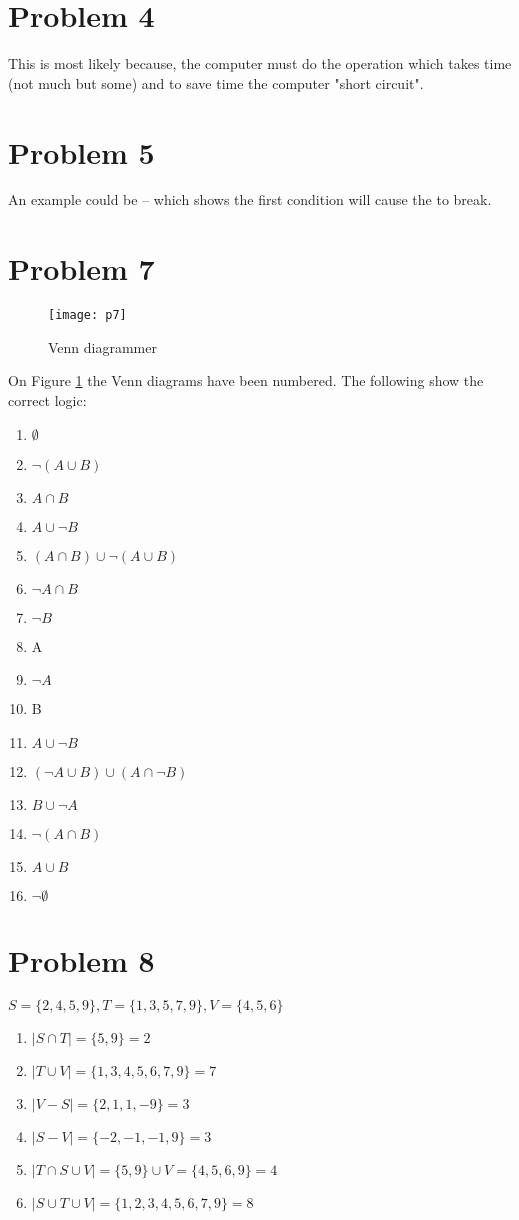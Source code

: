 \documentclass[english,10pt,a4paper]{article}
\begin{document}
\section*{Problem 4}
This is most likely because, the computer must do the operation which takes time (not much but some) and to save time the computer "short circuit".


\section*{Problem 5}
An example could be  -- which shows the first condition will cause the  to break.



\newpage
\section*{Problem 7}
\begin{figure}[hbtp]
\centering
\texttt{[image: p7]}
\caption{Venn diagrammer}
\label{fig:venn}
\end{figure}
On Figure \ref{fig:venn} the Venn diagrams have been numbered.
The following show the correct logic:
\begin{enumerate}
\item $\emptyset$
\item $\neg (A \cup B)$
\item $A \cap B$
\item $A \cup \neg B$
\item $(A \cap B) \cup \neg (A \cup B)$
\item $\neg A \cap B$
\item $\neg B$
\item A
\item $\neg A$
\item B
\item $A \cup \neg B$
\item $(\neg A \cup B) \cup (A \cap \neg B)$
\item $B \cup \neg A$
\item $\neg(A\cap B)$
\item $A\cup B $
\item $\neg \emptyset$
\end{enumerate}


\newpage
\section*{Problem 8}
$S=\{2, 4, 5, 9\}, T=\{1,3,5,7,9\}, V=\{4, 5, 6\}$
\begin{enumerate}[a]
\item $|S\cap T| = \{5, 9\} =2$
\item $|T\cup V| = \{1, 3, 4, 5 ,6, 7, 9\} =7$
\item $|V-S| = \{2, 1, 1 ,-9\} = 3$
\item $|S-V| = \{-2, -1, -1, 9\} = 3$
\item $|T\cap S \cup V| = \{5,9\} \cup V = \{4, 5, 6, 9\} = 4$
\item $|S \cup T \cup V| = \{1,2,3,4,5,6,7,9\} = 8$
\end{enumerate}
\end{document}
